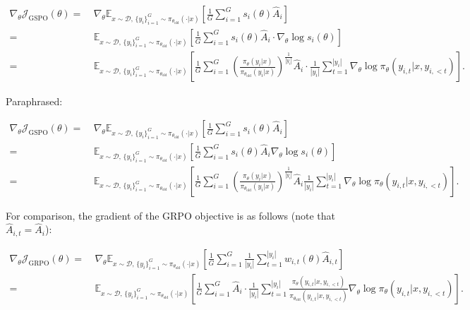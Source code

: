 \begin{align}
\nabla_{\theta} \mathcal{J}_\text{GSPO} (\theta)
=&\
\nabla_{\theta} \mathbb{E}_{ x \sim \mathcal{D},\, \{y_i\}_{i=1}^G \sim \pi_{\theta_\text{old}}( \cdot | x) }
\left[
\frac{1}{G} \sum_{i=1}^{G} s_{i}(\theta) \widehat{A}_{i}
\right] \\
= &\
\mathbb{E}_{ x \sim \mathcal{D},\, \{y_i\}_{i=1}^G \sim \pi_{\theta_\text{old}}( \cdot | x) }
\left[
\frac{1}{G} \sum_{i=1}^{G}
s_{i}(\theta) \widehat{A}_{i}
\cdot \nabla_{\theta} \log s_{i}(\theta)
\right] \\
= &\
\mathbb{E}_{ x \sim \mathcal{D},\, \{y_i\}_{i=1}^G \sim \pi_{\theta_\text{old}}( \cdot | x) }
\left[
\frac{1}{G} \sum_{i=1}^{G}
\left( \frac{ \pi_{\theta} (y_i | x) }{ \pi_{\theta_\text{old}} (y_i | x)} \right)^{\frac{1}{|y_i|}} \widehat{A}_{i}
\cdot \frac{1}{|y_i|} \sum_{t=1}^{|y_i|} \nabla_{\theta} \log \pi_{\theta} (y_{i,t} | x, y_{i,<t})
\right].
\label{equ:gspo_grad}
\end{align}

Paraphrased:

\begin{align}
\nabla_{\theta} \mathcal{J}_\text{GSPO} (\theta)
=&\
\nabla_{\theta} \mathbb{E}_{ x \sim \mathcal{D},\, \{y_i\}_{i=1}^G \sim \pi_{\theta_\text{old}}( \cdot | x) }
\left[
\frac{1}{G} \sum_{i=1}^{G} s_{i}(\theta) \widehat{A}_{i}
\right] \\
= &\
\mathbb{E}_{ x \sim \mathcal{D},\, \{y_i\}_{i=1}^G \sim \pi_{\theta_\text{old}}( \cdot | x) }
\left[
\frac{1}{G} \sum_{i=1}^{G}
s_{i}(\theta) \widehat{A}_{i}
\nabla_{\theta} \log s_{i}(\theta)
\right] \\
=&\
\mathbb{E}_{ x \sim \mathcal{D},\, \{y_i\}_{i=1}^G \sim \pi_{\theta_\text{old}}( \cdot | x) }
\left[
\frac{1}{G} \sum_{i=1}^{G}
\left( \frac{ \pi_{\theta} (y_i | x) }{ \pi_{\theta_\text{old}} (y_i | x)} \right)^{\frac{1}{|y_i|}} \widehat{A}_{i}
\frac{1}{|y_i|} \sum_{t=1}^{|y_i|} \nabla_{\theta} \log \pi_{\theta} (y_{i,t} | x, y_{i,<t})
\right].
\label{equ:gspo_grad}
\end{align}

For comparison, the gradient of the GRPO objective is as follows (note that $\widehat{A}_{i,t} = \widehat{A}_{i}$):

\begin{align}
\nabla_{\theta} \mathcal{J}_\text{GRPO} (\theta) 
=&\ 
\nabla_{\theta} \mathbb{E}_{ x \sim \mathcal{D},\, \{y_i\}_{i=1}^G \sim \pi_{\theta_\text{old}}( \cdot | x) }
\left[ \frac{1}{G} \sum_{i=1}^{G} \frac{1}{|y_i|} \sum_{t=1}^{|y_i|} 
w_{i,t}(\theta) \widehat{A}_{i,t}
\right] \\
=&\
\mathbb{E}_{ x \sim \mathcal{D},\, \{y_i\}_{i=1}^G \sim \pi_{\theta_\text{old}}( \cdot | x) }
\left[ \frac{1}{G} \sum_{i=1}^{G} \widehat{A}_{i} 
\cdot \frac{1}{|y_i|} \sum_{t=1}^{|y_i|} 
\frac{ \pi_{\theta} (y_{i,t} | x, y_{i,<t}) }{ \pi_{\theta_\text{old}} (y_{i,t} | x,y_{i,<t})} 
\nabla_{\theta} \log \pi_{\theta} (y_{i,t} | x, y_{i,<t})  
\right].
\end{align}

